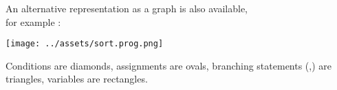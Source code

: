 An alternative representation as a graph is also available,\\
for example :

\begin{center}
\texttt{[image: ../assets/sort.prog.png]}
\end{center}
Conditions are diamonds, assignments are ovals, branching statements
(,) are triangles, variables are rectangles.

